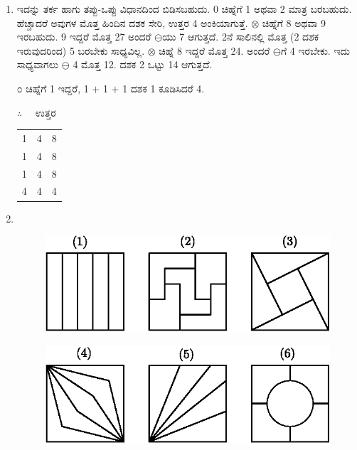 \begin{enumerate}
{\fontsize{10.5}{11.6}}

\item ಇದನ್ನು ತರ್ಕ ಹಾಗು ತಪ್ಪು-ಒಪ್ಪು ವಿಧಾನದಿಂದ ಬಿಡಿಸಬಹುದು. 0 ಚಿಹ್ನೆಗೆ 1 ಅಥವಾ 2 ಮಾತ್ರ ಬರಬಹುದು. ಹೆಚ್ಚಾದರೆ ಅವುಗಳ ಮೊತ್ತ ಹಿಂದಿನ ದಶಕ ಸೇರಿ, ಉತ್ತರ 4 ಅಂಕಿಯಾಗುತ್ತೆ. $\otimes$ ಚಿಹ್ನೆಗೆ 8 ಅಥವಾ 9 ಇರಬಹುದು. 9 ಇದ್ದರೆ ಮೊತ್ತ 27 ಅಂದರೆ $\ominus$ಯು 7 ಆಗುತ್ತದೆ. 2ನೆ ಸಾಲಿನಲ್ಲಿ ಮೊತ್ತ (2 ದಶಕ ಇರುವುದರಿಂದ) 5 ಬರಬೇಕು ಸಾಧ್ಯವಿಲ್ಲ. $\otimes$ ಚಿಹ್ನೆ 8 ಇದ್ದರೆ ಮೊತ್ತ 24. ಅಂದರೆ $\ominus$ಗೆ 4 ಇರಬೇಕು. ಇದು ಸಾಧ್ಯವಾಗಲು $\ominus$ 4 ಮೊತ್ತ 12. ದಶಕ 2 ಒಟ್ಟು 14 ಆಗುತ್ತದೆ. 

೦ ಚಿಹ್ನೆಗೆ 1 ಇದ್ದರೆ, 1 $+$ 1 $+$ 1 ದಶಕ 1 ಕೂಡಿಸಿದರೆ 4. 

\smallskip

$\therefore\quad$ ಉತ್ತರ
\begin{tabular}[t]{lll}
1 & 4 & 8\\
1 & 4 & 8\\
1 & 4 & 8\\
\hline
4 & 4 & 4\\
\end{tabular}

\item
~
\vskip -0.3cm

\begin{figure}[H]
\centering
\includegraphics{images/chap12/ans25a.eps}
\end{figure} 

\begin{figure}[H]
\centering
\includegraphics{images/chap12/ans25b.eps}
\end{figure} 



\end{enumerate}
